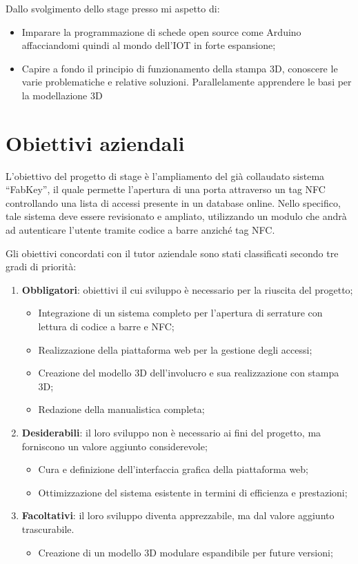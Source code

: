 Dallo svolgimento dello stage presso \lab{} mi aspetto di:
\begin{itemize}
\item Imparare la programmazione di schede open source come Arduino affacciandomi quindi al mondo dell'IOT in forte espansione;
\item Capire a fondo il principio di funzionamento della stampa 3D, conoscere le varie problematiche e relative soluzioni. Parallelamente apprendere le basi per la modellazione 3D
\end{itemize}

\section{Obiettivi aziendali}
L'obiettivo del progetto di stage è l'ampliamento del già collaudato sistema ``FabKey'', il quale permette l'apertura di una porta attraverso un tag NFC controllando una lista di accessi presente in un database online. Nello specifico, tale sistema deve essere revisionato e ampliato, utilizzando un modulo che andrà ad autenticare l'utente tramite codice a barre anziché tag NFC.

Gli obiettivi concordati con il tutor aziendale sono stati classificati secondo tre gradi di priorità:

\begin{enumerate}
\item \textbf{Obbligatori}: obiettivi il cui sviluppo è necessario per la riuscita del progetto;
\begin{itemize}
\item Integrazione di un sistema completo per l'apertura di serrature con lettura di codice a barre e NFC; 
\item Realizzazione della piattaforma web per la gestione degli accessi; 
\item Creazione del modello 3D dell'involucro e sua realizzazione con stampa 3D; 
\item Redazione della manualistica completa; 
\end{itemize}
\item \textbf{Desiderabili}: il loro sviluppo non è necessario ai fini del progetto, ma forniscono un valore aggiunto considerevole;
\begin{itemize}
\item Cura e definizione dell'interfaccia grafica della piattaforma web;
\item Ottimizzazione del sistema esistente in termini di efficienza e prestazioni; 
\end{itemize}
\item \textbf{Facoltativi}: il loro sviluppo diventa apprezzabile, ma dal valore aggiunto trascurabile.
\begin{itemize}
\item Creazione di un modello 3D modulare espandibile per future versioni; 
\end{itemize}
\end{enumerate}

